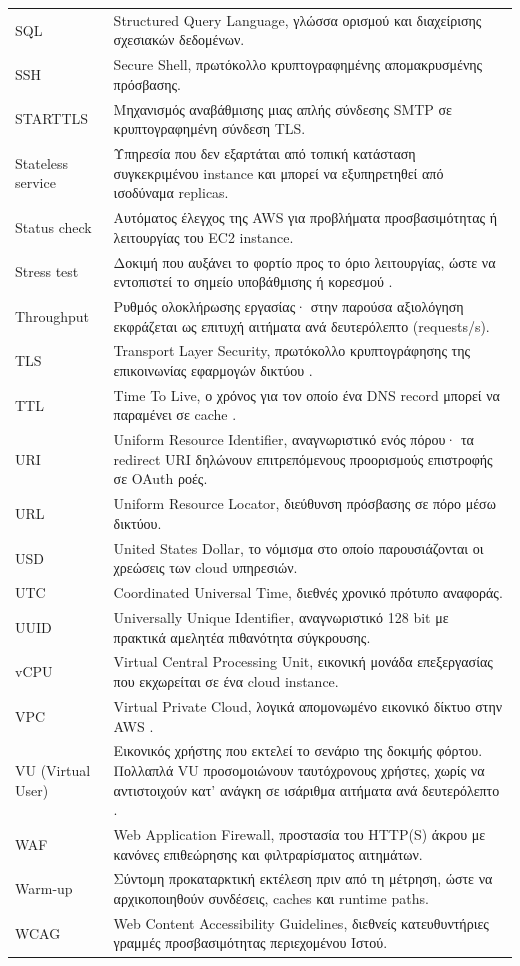 \documentclass[12pt,a4paper,twoside,fleqn]{book}
\begin{document}
\begin{longtable}{@{}p{3.8cm}p{9.2cm}@{}}
SQL & Structured Query Language, γλώσσα ορισμού και διαχείρισης σχεσιακών δεδομένων.\\
SSH & Secure Shell, πρωτόκολλο κρυπτογραφημένης απομακρυσμένης πρόσβασης.\\
STARTTLS & Μηχανισμός αναβάθμισης μιας απλής σύνδεσης SMTP σε κρυπτογραφημένη σύνδεση TLS.\\
Stateless service & Υπηρεσία που δεν εξαρτάται από τοπική κατάσταση συγκεκριμένου instance και μπορεί να εξυπηρετηθεί από ισοδύναμα replicas.\\
Status check & Αυτόματος έλεγχος της AWS για προβλήματα προσβασιμότητας ή λειτουργίας του EC2 instance.\\
Stress test & Δοκιμή που αυξάνει το φορτίο προς το όριο λειτουργίας, ώστε να εντοπιστεί το σημείο υποβάθμισης ή κορεσμού \cite{grafana2026k6testing}.\\
Throughput & Ρυθμός ολοκλήρωσης εργασίας· στην παρούσα αξιολόγηση εκφράζεται ως επιτυχή αιτήματα ανά δευτερόλεπτο (requests/s).\\
TLS & Transport Layer Security, πρωτόκολλο κρυπτογράφησης της επικοινωνίας εφαρμογών δικτύου \cite{rfc8446}.\\
TTL & Time To Live, ο χρόνος για τον οποίο ένα DNS record μπορεί να παραμένει σε cache \cite{rfc1034}.\\
URI & Uniform Resource Identifier, αναγνωριστικό ενός πόρου· τα redirect URI δηλώνουν επιτρεπόμενους προορισμούς επιστροφής σε OAuth ροές.\\
URL & Uniform Resource Locator, διεύθυνση πρόσβασης σε πόρο μέσω δικτύου.\\
USD & United States Dollar, το νόμισμα στο οποίο παρουσιάζονται οι χρεώσεις των cloud υπηρεσιών.\\
UTC & Coordinated Universal Time, διεθνές χρονικό πρότυπο αναφοράς.\\
UUID & Universally Unique Identifier, αναγνωριστικό 128 bit με πρακτικά αμελητέα πιθανότητα σύγκρουσης.\\
vCPU & Virtual Central Processing Unit, εικονική μονάδα επεξεργασίας που εκχωρείται σε ένα cloud instance.\\
VPC & Virtual Private Cloud, λογικά απομονωμένο εικονικό δίκτυο στην AWS \cite{aws2026vpc}.\\
VU (Virtual User) & Εικονικός χρήστης που εκτελεί το σενάριο της δοκιμής φόρτου. Πολλαπλά VU προσομοιώνουν ταυτόχρονους χρήστες, χωρίς να αντιστοιχούν κατ' ανάγκη σε ισάριθμα αιτήματα ανά δευτερόλεπτο \cite{grafana2026k6metrics}.\\
WAF & Web Application Firewall, προστασία του HTTP(S) άκρου με κανόνες επιθεώρησης και φιλτραρίσματος αιτημάτων.\\
Warm-up & Σύντομη προκαταρκτική εκτέλεση πριν από τη μέτρηση, ώστε να αρχικοποιηθούν συνδέσεις, caches και runtime paths.\\
WCAG & Web Content Accessibility Guidelines, διεθνείς κατευθυντήριες γραμμές προσβασιμότητας περιεχομένου Ιστού.\\
\end{longtable}
\end{document}

